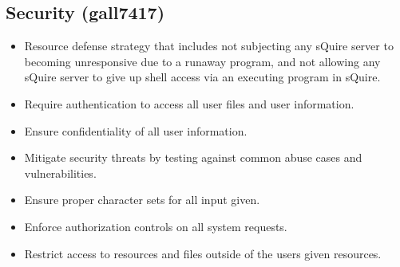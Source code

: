 \documentclass[11pt]{report}
\begin{document}
    \subsection{Security (gall7417)}
        \begin{itemize}
            \item Resource defense strategy that includes not subjecting any sQuire server to becoming unresponsive due to a runaway program, and not allowing any sQuire server to give up shell access via an executing program in sQuire.
            \item Require authentication to access all user files and user information.
            \item Ensure confidentiality of all user information.
            \item Mitigate security threats by testing against common abuse cases and vulnerabilities.
            \item Ensure proper character sets for all input given.
            \item Enforce authorization controls on all system requests.
            \item Restrict access to resources and files outside of the users given resources.
        \end{itemize}

    
\end{document}
